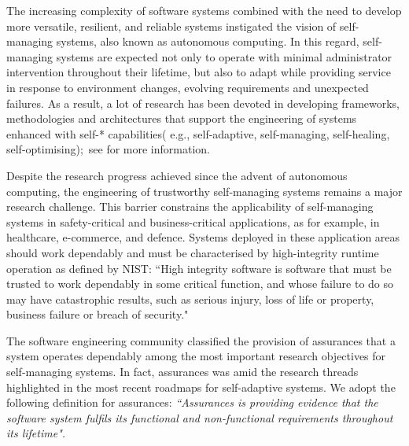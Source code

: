 
The increasing complexity of software systems combined with the need to develop more versatile, resilient, and reliable systems instigated the vision of self-managing systems, also known as autonomous computing\cite{Kephart2003, Ganek2003}. In this regard, self-managing systems are expected not only to operate with minimal administrator intervention throughout their lifetime, but also to adapt while providing service in response to environment changes, evolving requirements and unexpected failures. As a result, a lot of research has been devoted in developing frameworks, methodologies and architectures that support the engineering of systems enhanced with self-* capabilities( e.g., self-adaptive, self-managing, self-healing, self-optimising);~see \cite{Salehie2009, Huebscher2008} for more information. 

Despite the research progress achieved since the advent of autonomous computing, the engineering of trustworthy self-managing systems remains a major research challenge. This barrier constrains the applicability of self-managing systems in safety-critical and business-critical applications, as for example, in healthcare, e-commerce, and defence. Systems deployed in these application areas should work dependably and must be characterised by high-integrity runtime operation as defined by NIST: ``High integrity software is software that must be trusted to work dependably in some critical function, and whose failure to do so may have catastrophic results, such as serious injury, loss of life or property, business failure or breach of security."


The software engineering community classified the provision of assurances that a system operates dependably among the most important research objectives for self-managing systems. In fact, assurances was amid the research threads highlighted in the most recent roadmaps for self-adaptive systems. We adopt the following definition for assurances: \textit{``Assurances is providing evidence that the software system fulfils its functional and non-functional requirements throughout its lifetime".}

